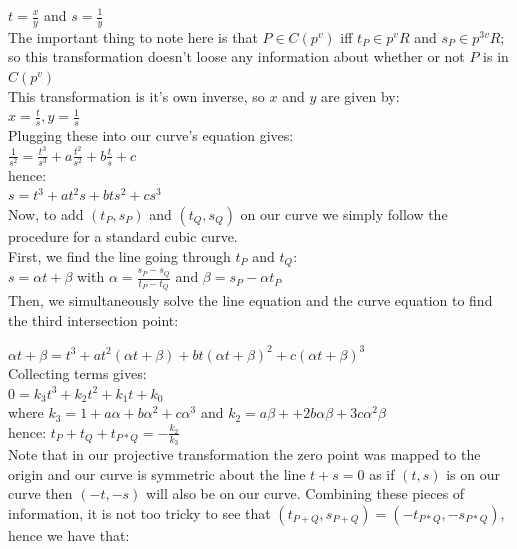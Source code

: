 \documentclass{article}
\begin{document}
$t = \frac{x}{y}$ and $s = \frac{1}{y}$ \\

The important thing to note here is that $P \in C(p^v)$ iff $t_P \in p^v R$ and $s_P \in p^{3v} R$; so this transformation doesn't loose any information about whether or not $P$ is in $C(p^v)$\\

This transformation is it's own inverse, so $x$ and $y$ are given by:\\

$x = \frac{t}{s}, y = \frac{1}{s}$\\

Plugging these into our curve's equation gives:\\

$\frac{1}{s^2} = \frac{t^3}{s^3} + a \frac{t^2}{s^2} + b \frac{t}{s} + c$\\

hence:\\

$s = t^3 + a t^2 s + b t s^2 + c s^3$\\

Now, to add $(t_P, s_P)$ and $(t_Q, s_Q)$ on our curve we simply follow the procedure for a standard cubic curve.\\

First, we find the line going through $t_P$ and $t_Q$:\\

$s = \alpha t + \beta$ with $\alpha = \frac{s_P - s_Q}{t_P - t_Q}$ and $\beta = s_P - \alpha t_P$ \\

Then, we simultaneously solve the line equation and the curve equation to find the third intersection point:

$\alpha t + \beta = t^3 + a t^2 (\alpha t + \beta) + b t (\alpha t + \beta)^2 + c (\alpha t + \beta)^3$\\

Collecting terms gives:\\

$0 = k_3 t^3 + k_2 t^2 + k_1 t + k_0$\\

where $k_3 = 1 + a \alpha + b \alpha^2 + c \alpha^3$ and $k_2 = a \beta + + 2 b \alpha \beta + 3c \alpha^2 \beta$\\

hence: $t_P + t_Q + t_{P*Q} = -\frac{k_2}{k_3}$\\

Note that in our projective transformation the zero point was mapped to the origin and our curve is symmetric about the line $t + s = 0$ as if $(t, s)$ is on our curve then $(-t, -s)$ will also be on our curve. Combining these pieces of information, it is not too tricky to see that $(t_{P + Q}, s_{P + Q}) = (-t_{P * Q}, -s_{P * Q})$, hence we have that:\\
\end{document}
